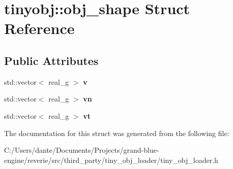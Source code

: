 \hypertarget{structtinyobj_1_1obj__shape}{}\section{tinyobj\+::obj\+\_\+shape Struct Reference}
\label{structtinyobj_1_1obj__shape}
\subsection*{Public Attributes}
\begin{DoxyCompactItemize}
\item 
\mbox{\label{structtinyobj_1_1obj__shape_a7617f81c5419d166b5cdb15d08c438ab}} 
std\+::vector$<$ real\+\_\+g $>$ {\bfseries v}
\item 
\mbox{\label{structtinyobj_1_1obj__shape_ac54f44e62314932fde3437f5245bd0a4}} 
std\+::vector$<$ real\+\_\+g $>$ {\bfseries vn}
\item 
\mbox{\label{structtinyobj_1_1obj__shape_a0419efe8afdd330989d811253a19a30a}} 
std\+::vector$<$ real\+\_\+g $>$ {\bfseries vt}
\end{DoxyCompactItemize}


The documentation for this struct was generated from the following file\+:\begin{DoxyCompactItemize}
\item 
C\+:/\+Users/dante/\+Documents/\+Projects/grand-\/blue-\/engine/reverie/src/third\+\_\+party/tiny\+\_\+obj\+\_\+loader/tiny\+\_\+obj\+\_\+loader.\+h\end{DoxyCompactItemize}
